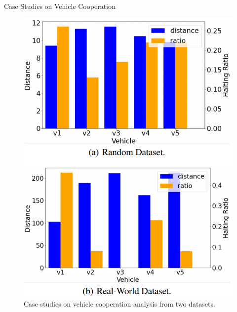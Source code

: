 \documentclass{beamer}
\begin{document}
\begin{frame}{Case Studies on Vehicle Cooperation}
	\begin{figure}
		\centering
		\includegraphics[scale=0.2]{graph.png}
		\caption{Case studies on vehicle cooperation analysis from two datasets.}
	\end{figure}
\end{frame}
\end{document}
